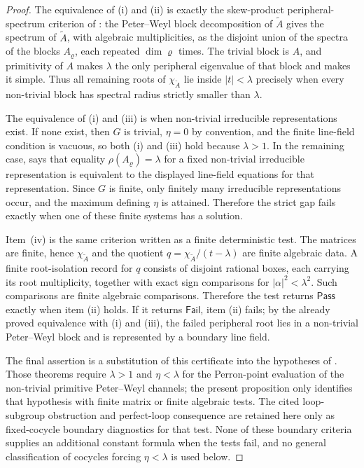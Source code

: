 \documentclass[11pt,a4paper]{amsart}
\theoremstyle{plain}
\theoremstyle{definition}
\theoremstyle{remark}
\begin{document}
\begin{proof}
  The equivalence of \rm(i) and \rm(ii) is exactly the skew-product
  peripheral-spectrum criterion of
  : the Peter--Weyl block
  decomposition of \(\widetilde A\) gives the spectrum of
  \(\widetilde A\), with algebraic multiplicities, as the disjoint union
  of the spectra of the blocks \(A_\varrho\), each repeated
  \(\dim\varrho\) times. The trivial block is \(A\), and primitivity of
  \(A\) makes \(\lambda\) the only peripheral eigenvalue of that block and
  makes it simple. Thus all remaining roots of
  \(\chi_{\widetilde A}\) lie inside \(|t|<\lambda\) precisely when every
  non-trivial block has spectral radius strictly smaller than \(\lambda\).

  The equivalence of \rm(i) and \rm(iii) is
   when non-trivial irreducible
  representations exist. If none exist, then \(G\) is trivial, \(\eta=0\)
  by convention, and the finite line-field condition is vacuous, so both
  \rm(i) and \rm(iii) hold because \(\lambda>1\). In the remaining case,
   says that equality
  \(\rho(A_\varrho)=\lambda\) for a fixed non-trivial irreducible
  representation is equivalent to the displayed line-field equations for
  that representation. Since \(G\) is finite, only finitely many
  irreducible representations occur, and the maximum defining \(\eta\) is
  attained. Therefore the strict gap fails exactly when one of these
  finite systems has a solution.

  Item~\rm(iv) is the same criterion written as a finite deterministic test.
  The matrices are finite, hence \(\chi_{\widetilde A}\) and the quotient
  \(q=\chi_{\widetilde A}/(t-\lambda)\) are finite algebraic data.  A finite
  root-isolation record for \(q\) consists of disjoint rational boxes, each
  carrying its root multiplicity, together with exact sign comparisons for
  \(|\alpha|^2<\lambda^2\).  Such comparisons are finite algebraic
  comparisons.  Therefore the test returns \(\mathsf{Pass}\) exactly when item
  \rm(ii) holds.  If it returns \(\mathsf{Fail}\), item \rm(ii) fails; by the
  already proved equivalence with \rm(i) and \rm(iii), the failed peripheral
  root lies in a non-trivial Peter--Weyl block and is represented by a
  boundary line field.

  The final assertion is a substitution of this certificate into the
  hypotheses of
  . Those
  theorems require \(\lambda>1\) and \(\eta<\lambda\) for the Perron-point
  evaluation of the non-trivial primitive Peter--Weyl channels; the present
  proposition only identifies that hypothesis with finite matrix or
  finite algebraic tests.  The cited loop-subgroup obstruction and
  perfect-loop consequence are retained here only as fixed-cocycle boundary
  diagnostics for that test.  None of these boundary criteria supplies an
  additional constant formula when the tests fail, and no general
  classification of cocycles forcing \(\eta<\lambda\) is used below.
\end{proof}
\end{document}
